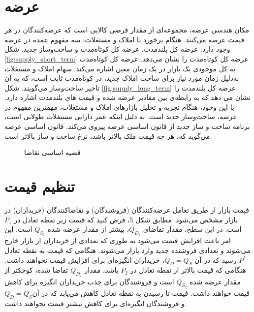 \section{عرضه}

مکان هندسی عرضه، مجموعه‌ای از مقدار فرضی کالایی است که عرضه‌کنندگان در هر قیمت عرضه می‌کنند. هنگام برخورد با املاک و مستغلات، سه مفهوم عمده در عرضه وجود دارد: عرضه کل بلندمدت، عرضه کل کوتاه‌مدت و ساخت‌و‌ساز جدید. شکل
\ref{fig:supply_short_term}
  عرضه کل کوتاه‌مدت را نشان می‌دهد. عرضه کل کوتاه‌مدت به کل موجودی یک بازار در یک زمان معین اشاره می‌کند. سهام املاک و مستغلات به‌دلیل زمان مورد نیاز برای ساخت املاک جدید، در کوتاه‌مدت  ثابت است، که به آن تاخیر ساخت‌و‌ساز می‌گویند. شکل
  \ref{fig:supply_long_term}
   عرضه کل بلندمدت را نشان می دهد که به رابطه‌ی بین مقادیر عرضه شده و قیمت های بلندمدت اشاره دارد. با این وجود، هنگام تجزیه و تحلیل بازارهای املاک و مستغلات، مهمترین مفهوم در عرضه، ساخت‌و‌ساز جدید است. به دلیل اینکه عمر دارایی مستغلات طولانی است، برنامه ساخت و ساز جدید از قانون اساسی عرضه پیروی می‌کند. قانون اساسی عرضه  می‌گوید که، هر چه قیمت ملک بالاتر باشد، نرخ ساخت و ساز بالاتر است.

\begin{figure}[H]
	\centering
	\caption{قضیه اساسی تقاضا}
\end{figure}

\section{تنظیم قیمت}

قیمت بازار از طریق تعامل عرضه‌کنندگان (فروشندگان) و تقاضاکنندگان (خریداران) در بازار مشخص می‌شود.
مطابق شکل 5، فرض کنید که قیمت زیر نقطه تعادل در $P_1$ است. در این سطح، مقدار تقاضای $Q_{D_1}$، بیشتر از مقدار عرضه شده $Q_{S_1}$ است. این امر باعث افزایش قیمت می‌شود به طوری که تعدادی از خریداران از بازار خارج می‌شوند و تعدادی فروشنده جدید وارد بازار می‌شوند. هنگامی که قیمت به نقطه تعادل $P^*$ رسید که در آن $Q_D = Q_S$، خریداران انگیزه‌ای برای افزایش قیمت نخواهند داشت. هنگامی که قیمت بالاتر از نقطه تعادل در $P_2$ باشد، مقدار $Q_{D_2}$ تقاضا شده، کوچکتر از مقدار عرضه شده $Q_{S_2}$ است و فروشندگان برای جذب خریداران انگیزه برای کاهش قیمت خواهند داشت. قیمت تا رسیدن به نقطه تعادل کاهش می‌یابد که در آن$Q_D = Q_S$ و فروشندگان انگیزه‌ای برای کاهش بیشتر قیمت نخواهند داشت.

